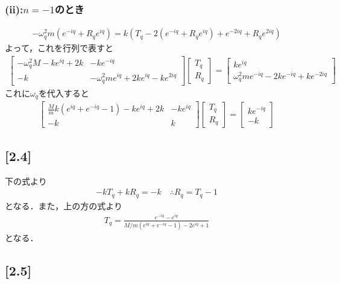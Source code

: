 \documentclass[12pt,dvipdfmx]{jsarticle}
\begin{document}
\subsubsection*{(ii):$n=-1$のとき}
\begin{eqnarray}
  -\omega_q^2m \left( e^{-iq} + R_q e^{iq} \right) = k\left( T_q-2 \left( e^{-iq} + R_q e^{iq} \right) + e^{-2iq} + R_q e^{2iq} \right)
\end{eqnarray}
よって，これを行列で表すと
\begin{eqnarray}
  \begin{bmatrix}
    -\omega_q^2M -ke^{iq}+2k & -ke^{-iq} \\
    -k & -\omega_q^2 m e^{iq} + 2ke^{iq}-k e^{2iq}
  \end{bmatrix}
  \begin{bmatrix}
    T_q \\
    R_q
  \end{bmatrix}
  =
  \begin{bmatrix}
    ke^{iq} \\
    \omega_q^2 m e^{-iq} -2ke^{-iq}+k e^{-2iq}
  \end{bmatrix}
\end{eqnarray}
これに$\omega_q$を代入すると
\begin{eqnarray}
  \begin{bmatrix}
    \frac{M}{m}k(e^{iq}+e^{-iq}-1)-ke^{iq}+2k & -ke^{iq}\\
    -k & k 
  \end{bmatrix}
  \begin{bmatrix}
    T_q \\
    R_q
  \end{bmatrix} =
  \begin{bmatrix}
    ke^{-iq} \\
    -k
  \end{bmatrix}
\end{eqnarray}
\subsection*{\large{[2.4]}}
下の式より
\begin{eqnarray}
  -k T_q + kR_q = -k \quad\therefore R_q = T_q-1
\end{eqnarray}
となる．また，上の方の式より
\begin{eqnarray}
  T_q = \frac{e^{-iq}-e^{iq}}{M/m(e^{iq}+e^{-iq}-1)-2e^{iq}+1}
\end{eqnarray}
となる．
\subsection*{\large{[2.5]}}
\end{document}
